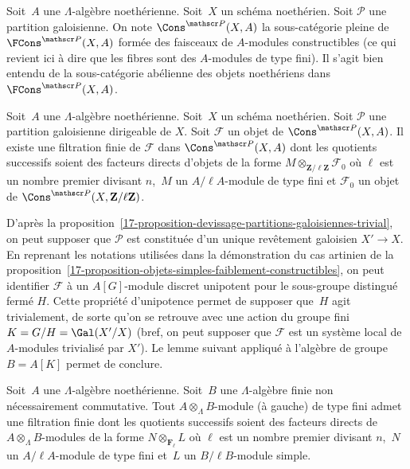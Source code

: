 \documentclass[10pt]{../fichiers-configuration-latex/smfart}
\begin{document}
\begin{definition2}
Soit $A$ une $\Lambda$-algèbre noethérienne.
Soit $X$ un schéma noethérien. Soit
$\mathscr P$ une partition galoisienne. On note $\Cons^{\mathscr P}(X,A)$
la sous-catégorie pleine de $\FCons^{\mathscr P}(X,A)$ formée des faisceaux
de $A$-modules constructibles (ce qui revient ici à dire que
les fibres sont des $A$-modules de type fini). Il s'agit bien entendu de la
sous-catégorie abélienne des objets noethériens dans $\FCons^{\mathscr
P}(X,A)$.
\end{definition2}

\begin{proposition2}\label{17-proposition-devissage-gabber}
Soit $A$ une $\Lambda$-algèbre noethérienne. Soit $X$ un schéma noethérien.
Soit $\mathscr P$ une partition galoisienne dirigeable de $X$. Soit $\mathscr
F$ un objet de $\Cons^{\mathscr P}(X,A)$. 
Il existe une filtration finie de $\mathscr F$ dans $\Cons^{\mathscr P}(X,A)$
dont les quotients successifs soient des facteurs directs d'objets de la
forme $M\otimes_{\mathbf{Z}/\ell\mathbf{Z}} {\mathscr F}_0$ où $\ell$ est
un nombre premier divisant $n$, $M$ un $A/\ell A$-module de type fini et
${\mathscr F}_0$ un objet de $\Cons^{\mathscr
P}(X,\mathbf{Z}/\ell\mathbf{Z})$.
\end{proposition2}

D'après la
proposition~\ref{17-proposition-devissage-partitions-galoisiennes-trivial}, on
peut supposer que $\mathscr P$ est constituée d'un unique revêtement
galoisien $X'\to X$. En reprenant les notations utilisées dans la
démonstration du cas artinien de la
proposition~\ref{17-proposition-objets-simples-faiblement-constructibles}, on
peut identifier $\mathscr F$ à un $A[G]$-module discret unipotent pour le
sous-groupe distingué fermé $H$. Cette propriété d'unipotence permet de
supposer que $H$ agit trivialement, de sorte qu'on se retrouve avec une
action du groupe fini $K=G/H=\Gal(X'/X)$ (bref, on peut supposer que 
$\mathscr F$ est un système local de $A$-modules trivialisé par $X'$). Le
lemme suivant appliqué à l'algèbre de groupe $B=A[K]$ permet de conclure.

\begin{lemme2}
Soit $A$ une $\Lambda$-algèbre noethérienne. Soit $B$ une $\Lambda$-algèbre
finie non nécessairement commutative. Tout $A\otimes_\Lambda B$-module (à
gauche) de type fini admet une filtration finie dont les quotients successifs
soient des facteurs directs de $A\otimes_\Lambda B$-modules de la forme
$N\otimes_{\mathbf{F}_\ell} L$ où $\ell$ est un nombre premier divisant
$n$, $N$ un $A/\ell A$-module de type fini et $L$ un $B/\ell B$-module simple.
\end{lemme2}
\end{document}
